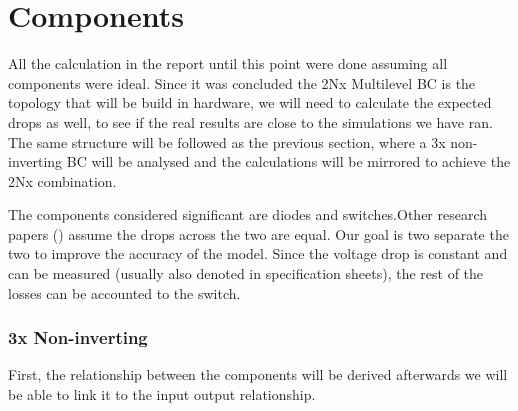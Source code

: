 \section{Components}\label{ch:CD}

All the calculation in the report until this point were done assuming all components were ideal. Since it was concluded the 2Nx Multilevel BC is the topology that will be build in hardware, we will need to calculate the expected drops as well, to see if the real results are close to the simulations we have ran. 
The same structure will be followed as the previous section, where a 3x non-inverting BC will be analysed and the calculations will be mirrored to achieve the 2Nx combination.

The components considered significant are diodes and switches.Other research papers (\cite{Padmanaban2015,Rosas-Caro2008}) assume the drops across the two are equal. Our goal is two separate the two to improve the accuracy of the model. Since the voltage drop is constant and can be measured (usually also denoted in specification sheets), the rest of the losses can be accounted to the switch.

\subsubsection{3x Non-inverting}

First, the relationship between the components will be derived afterwards we will be able to link it to the input output relationship.

